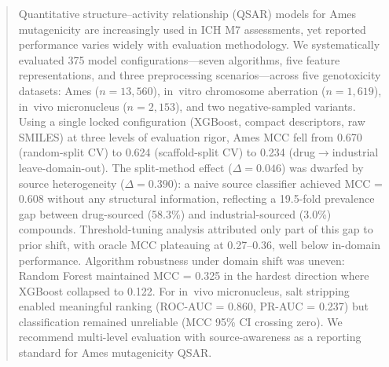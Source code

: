 \begin{abstract}
Quantitative structure--activity relationship (QSAR) models for Ames mutagenicity are increasingly used in ICH M7 assessments,\cite{ICH_M7_2017} yet reported performance varies widely with evaluation methodology. We systematically evaluated 375 model configurations---seven algorithms, five feature representations, and three preprocessing scenarios---across five genotoxicity datasets: Ames ($n = 13{,}560$), in~vitro chromosome aberration ($n = 1{,}619$), in~vivo micronucleus ($n = 2{,}153$), and two negative-sampled variants. Using a single locked configuration (XGBoost, compact descriptors, raw SMILES) at three levels of evaluation rigor, Ames MCC fell from 0.670 (random-split CV) to 0.624 (scaffold-split CV) to 0.234 (drug$\to$industrial leave-domain-out). The split-method effect ($\Delta = 0.046$) was dwarfed by source heterogeneity ($\Delta = 0.390$): a naive source classifier achieved MCC = 0.608 without any structural information, reflecting a 19.5-fold prevalence gap between drug-sourced (58.3\%) and industrial-sourced (3.0\%) compounds. Threshold-tuning analysis attributed only part of this gap to prior shift, with oracle MCC plateauing at 0.27--0.36, well below in-domain performance. Algorithm robustness under domain shift was uneven: Random Forest maintained MCC = 0.325 in the hardest direction where XGBoost collapsed to 0.122. For in~vivo micronucleus, salt stripping enabled meaningful ranking (ROC-AUC = 0.860, PR-AUC = 0.237) but classification remained unreliable (MCC 95\% CI crossing zero). We recommend multi-level evaluation with source-awareness as a reporting standard for Ames mutagenicity QSAR.
\end{abstract}
